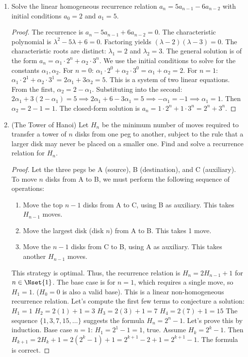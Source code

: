 \begin{enumerate}
    \item {} Solve the linear homogeneous recurrence relation $a_n = 5a_{n-1} - 6a_{n-2}$ with initial conditions $a_0 = 2$ and $a_1 = 5$.
    \begin{proof}
    The recurrence is $a_n - 5a_{n-1} + 6a_{n-2} = 0$.
    The characteristic polynomial is $\lambda^2 - 5\lambda + 6 = 0$.
    Factoring yields $(\lambda-2)(\lambda-3)=0$. The characteristic roots are distinct: $\lambda_1 = 2$ and $\lambda_2 = 3$.
    The general solution is of the form $a_n = \alpha_1 \cdot 2^n + \alpha_2 \cdot 3^n$.
    We use the initial conditions to solve for the constants $\alpha_1, \alpha_2$.
    For $n=0$: $\alpha_1 \cdot 2^0 + \alpha_2 \cdot 3^0 = \alpha_1 + \alpha_2 = 2$.
    For $n=1$: $\alpha_1 \cdot 2^1 + \alpha_2 \cdot 3^1 = 2\alpha_1 + 3\alpha_2 = 5$.
    This is a system of two linear equations. From the first, $\alpha_2 = 2 - \alpha_1$. Substituting into the second: $2\alpha_1 + 3(2-\alpha_1) = 5 \implies 2\alpha_1 + 6 - 3\alpha_1 = 5 \implies -\alpha_1 = -1 \implies \alpha_1 = 1$.
    Then $\alpha_2 = 2 - 1 = 1$.
    The closed-form solution is $a_n = 1 \cdot 2^n + 1 \cdot 3^n = 2^n + 3^n$.
    \end{proof}

    \item {} (The Tower of Hanoi) Let $H_n$ be the minimum number of moves required to transfer a tower of $n$ disks from one peg to another, subject to the rule that a larger disk may never be placed on a smaller one. Find and solve a recurrence relation for $H_n$.
    \begin{proof}
    Let the three pegs be A (source), B (destination), and C (auxiliary).
    To move $n$ disks from A to B, we must perform the following sequence of operations:
    \begin{enumerate}
        \item Move the top $n-1$ disks from A to C, using B as auxiliary. This takes $H_{n-1}$ moves.
        \item Move the largest disk (disk $n$) from A to B. This takes 1 move.
        \item Move the $n-1$ disks from C to B, using A as auxiliary. This takes another $H_{n-1}$ moves.
    \end{enumerate}
    This strategy is optimal. Thus, the recurrence relation is $H_n = 2H_{n-1} + 1$ for $n \in \Nset{1}$.
    The base case is for $n=1$, which requires a single move, so $H_1=1$. ($H_0=0$ is also a valid base).
    This is a linear non-homogeneous recurrence relation.
    Let's compute the first few terms to conjecture a solution:
    $H_1 = 1$
    $H_2 = 2(1)+1 = 3$
    $H_3 = 2(3)+1 = 7$
    $H_4 = 2(7)+1 = 15$
    The sequence $\{1, 3, 7, 15, \dots\}$ suggests the formula $H_n = 2^n - 1$.
    Let's prove this by induction. Base case $n=1$: $H_1 = 2^1-1=1$, true.
    Assume $H_k = 2^k-1$. Then $H_{k+1} = 2H_k + 1 = 2(2^k-1)+1 = 2^{k+1}-2+1 = 2^{k+1}-1$.
    The formula is correct.
    \end{proof}


\end{enumerate}
